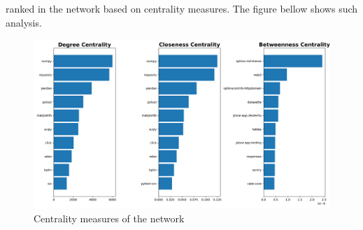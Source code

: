 \documentclass[a4paper]{article}
\begin{document}
ranked in the network based on centrality measures. The figure bellow shows
such analysis.
\begin{figure}[H]
    \centering
    \includegraphics[width=1\textwidth]{../pres/pics/sneak_peak.png}
    \caption{Centrality measures of the network}
\end{figure}
\end{document}
